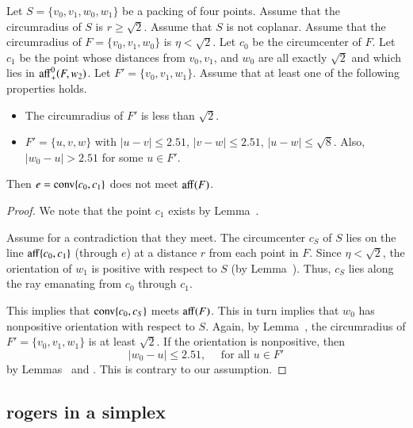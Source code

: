 \begin{tarskidata}
\begin{tarski}
\begin{lemma}
Let $S=\{v_0,v_1,w_0,w_1\}$ be a packing of four points.
Assume that the circumradius of $S$ is $r\ge \sqrt2$.  Assume
that $S$ is not coplanar.   Assume
that the circumradius of $F=\{v_0,v_1,w_0\}$ is
  $\eta < \sqrt2$.   Let $c_0$ be the circumcenter of $F$.
Let $c_1$ be the point whose distances from $v_0,v_1$, and $w_0$ are
all exactly $\sqrt2$ and which lies in
${\operatorname{aff}}^0_+(F,w_2)$.
Let $F'=\{v_0,v_1,w_1\}$.  Assume that at least one of
the following
properties holds.
\begin{itemize}
  \item The circumradius of $F'$ is less than $\sqrt2$.
  \item $F'=\{u,v,w\}$ with $|u-v| \le 2.51$, $|v-w|\le 2.51$,
        $|u-w|\le\sqrt8$. Also, $|w_0-u|>2.51$ for some $u\in F'$.
\end{itemize}

Then $e={\operatorname{conv}}\{c_0,c_1\}$ does not
meet ${\operatorname{aff}}(F)$.
\end{lemma}

\begin{proof}   We note that the point $c_1$ exists 
by Lemma~.

Assume for a contradiction that they meet.
The circumcenter $c_S$ of $S$ lies on
the line ${\operatorname{aff}}\{c_0,c_1\}$ (through $e$) at a
distance $r$ from each point in $F$.  
Since $\eta < \sqrt2$, the orientation of $w_1$ is positive
with respect to $S$ (by Lemma~). 
Thus, $c_S$ lies along
the ray emanating from $c_0$ through $c_1$.  

This implies that ${\operatorname{conv}}\{c_0,c_S\}$ meets ${\operatorname{aff}}(F)$.
This in turn implies that $w_0$ has nonpositive orientation with
respect to $S$.  Again, by Lemma~, the
circumradius of $F'=\{v_0,v_1,w_1\}$ is at least $\sqrt2$.
If the orientation is
nonpositive, then 
   $$|w_0-u|\le 2.51,\quad\text{ for all } u\in F'$$
by Lemmas~ and
. This is contrary to our assumption.
\end{proof}
\end{tarski}






\begin{tarski}
\subsection{rogers in a simplex}


\end{tarski}
\end{tarskidata}
